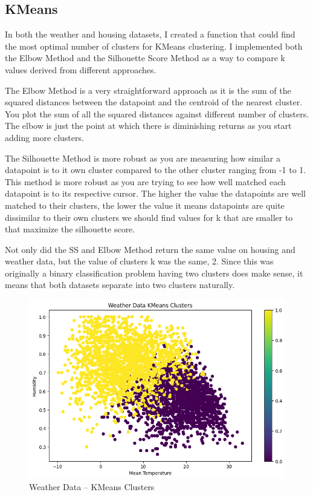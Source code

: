 \documentclass[conference]{IEEEtran}
\begin{document}
\subsection{KMeans}
In both the weather and housing datasets, I created a function that could find the most optimal number of clusters for KMeans clustering. I implemented both the Elbow Method and the Silhouette Score Method as a way to compare k values derived from different approaches. 
\par The Elbow Method is a very straightforward approach as it is the sum of the squared distances between the datapoint and the centroid of the nearest cluster. You plot the sum of all the squared distances against different number of clusters. The elbow is just the point at which there is diminishing returns as you start adding more clusters. 
\par The Silhouette Method is more robust as you are measuring how similar a datapoint is to it own cluster compared to the other cluster ranging from -1 to 1. This method is more robust as you are trying to see how well matched each datapoint is to its respective cursor. The higher the value the datapoints are well matched to their clusters, the lower the value it means datapoints are quite dissimilar to their own clusters we should find values for k that are smaller to that maximize the silhouette score. 
\par Not only did the SS and Elbow Method return the same value on housing and weather data, but the value of clusters k was the same, 2. Since this was originally a binary classification problem having two clusters does make sense, it means that both datasets separate into two clusters naturally.
\begin{figure} 
    \centering
    \includegraphics[width=1.0\linewidth]{figures//weather_figures/step_1a.png}
    \caption{Weather Data -- KMeans Clusters}
    \label{fig:1_weather_kmeans
}
\end{figure}
\end{document}
